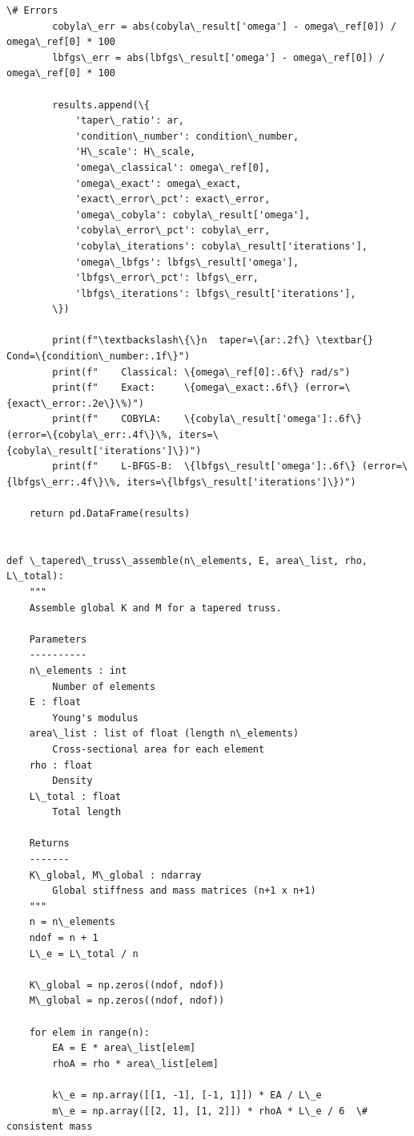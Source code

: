 \documentclass[12pt, a4paper]{article}
\begin{document}
\begin{lstlisting}[style=codestyle, caption={{novel_study.py --- Ill-Conditioning & Damage Detection}}]
        \# Errors
        cobyla\_err = abs(cobyla\_result['omega'] - omega\_ref[0]) / omega\_ref[0] * 100
        lbfgs\_err = abs(lbfgs\_result['omega'] - omega\_ref[0]) / omega\_ref[0] * 100

        results.append(\{
            'taper\_ratio': ar,
            'condition\_number': condition\_number,
            'H\_scale': H\_scale,
            'omega\_classical': omega\_ref[0],
            'omega\_exact': omega\_exact,
            'exact\_error\_pct': exact\_error,
            'omega\_cobyla': cobyla\_result['omega'],
            'cobyla\_error\_pct': cobyla\_err,
            'cobyla\_iterations': cobyla\_result['iterations'],
            'omega\_lbfgs': lbfgs\_result['omega'],
            'lbfgs\_error\_pct': lbfgs\_err,
            'lbfgs\_iterations': lbfgs\_result['iterations'],
        \})

        print(f"\textbackslash\{\}n  taper=\{ar:.2f\} \textbar{} Cond=\{condition\_number:.1f\}")
        print(f"    Classical: \{omega\_ref[0]:.6f\} rad/s")
        print(f"    Exact:     \{omega\_exact:.6f\} (error=\{exact\_error:.2e\}\%)")
        print(f"    COBYLA:    \{cobyla\_result['omega']:.6f\} (error=\{cobyla\_err:.4f\}\%, iters=\{cobyla\_result['iterations']\})")
        print(f"    L-BFGS-B:  \{lbfgs\_result['omega']:.6f\} (error=\{lbfgs\_err:.4f\}\%, iters=\{lbfgs\_result['iterations']\})")

    return pd.DataFrame(results)


def \_tapered\_truss\_assemble(n\_elements, E, area\_list, rho, L\_total):
    """
    Assemble global K and M for a tapered truss.

    Parameters
    ----------
    n\_elements : int
        Number of elements
    E : float
        Young's modulus
    area\_list : list of float (length n\_elements)
        Cross-sectional area for each element
    rho : float
        Density
    L\_total : float
        Total length

    Returns
    -------
    K\_global, M\_global : ndarray
        Global stiffness and mass matrices (n+1 x n+1)
    """
    n = n\_elements
    ndof = n + 1
    L\_e = L\_total / n

    K\_global = np.zeros((ndof, ndof))
    M\_global = np.zeros((ndof, ndof))

    for elem in range(n):
        EA = E * area\_list[elem]
        rhoA = rho * area\_list[elem]

        k\_e = np.array([[1, -1], [-1, 1]]) * EA / L\_e
        m\_e = np.array([[2, 1], [1, 2]]) * rhoA * L\_e / 6  \# consistent mass


\end{lstlisting}
\end{document}
